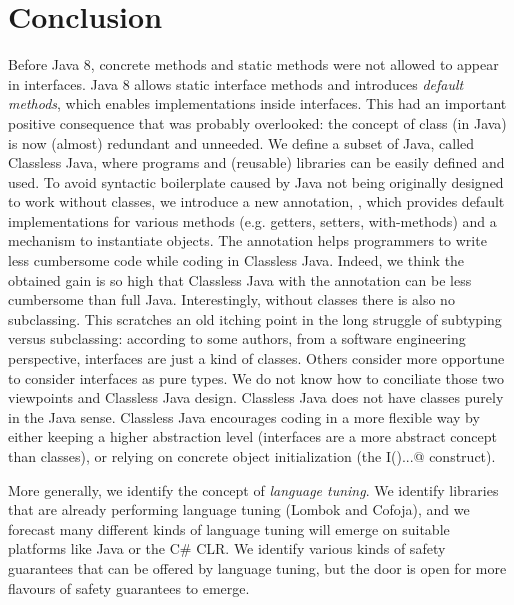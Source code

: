 \section{Conclusion}\label{sec:conclusion}

Before Java 8, concrete methods and static methods were not allowed
to appear in interfaces.  Java 8 allows static interface methods and
introduces \emph{default methods}, which enables implementations
inside interfaces. This had an important positive consequence that
was probably overlooked: the concept of class
(in Java) is now (almost) redundant and unneeded.  We define a subset of Java,
called Classless Java, where programs and (reusable) libraries can be
easily defined and used.  To avoid syntactic boilerplate
caused by Java not being originally designed to work without classes,
we introduce a new annotation, \mixin, which provides default implementations
for various methods (e.g. getters, setters, with-methods) and a
mechanism to instantiate objects. The \mixin annotation helps programmers
to write less cumbersome code while coding in Classless Java. Indeed, 
we think the obtained gain is so high that Classless Java with the \mixin
annotation can be less cumbersome than full Java.
Interestingly, without classes there is also no subclassing. This scratches an old
  itching point in the long struggle of subtyping versus subclassing:
  according to some authors, from a software engineering perspective,
  interfaces are just a kind of classes. Others consider more
  opportune to consider interfaces as pure types. We do not know how to conciliate
  those two viewpoints and Classless Java design.
  Classless Java does not have classes purely in the Java sense.  
 Classless Java encourages coding in a more flexible way by either
 keeping a higher abstraction level (interfaces are a more abstract
 concept than classes), or relying on concrete object initialization
 (the \Q@new I(){...}@ construct).
 
 More generally, we identify the concept of \emph{language tuning}.
 We identify libraries that are already performing language tuning (Lombok and Cofoja), and 
 we forecast many different kinds of language tuning will emerge on suitable platforms like Java or the C\# CLR.
 We identify various kinds of safety guarantees that can be offered by language tuning, but the door is open for more flavours of safety guarantees to emerge.

